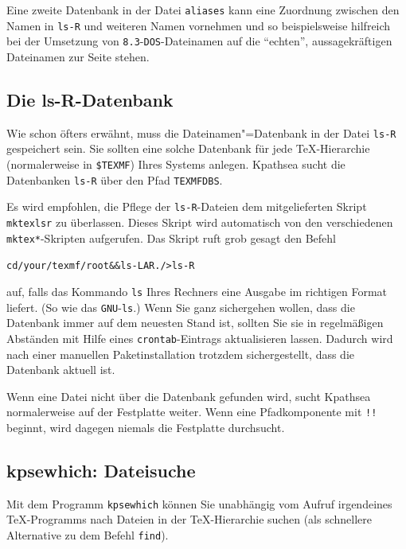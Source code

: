 \documentclass[12pt,ngerman,a4paper,fullparskip]{scrreprt}
\newcommand{\acro}[1]{\texttt{#1}}
\newcommand{\cmdname}[1]{\texttt{#1}}
\newcommand{\code}[1]{\texttt{#1}}
\newcommand{\file}[1]{\texttt{#1}}
\newcommand{\KPS}{Kpathsea\xspace}
\newcommand{\var}[1]{\texttt{#1}}
\newcommand{\samp}[1]{\texttt{#1}}
\begin{document}
Eine zweite Datenbank in der Datei \file{aliases} kann eine Zuordnung zwischen den Namen in \file{ls-R} und weiteren Namen vornehmen und so beispielsweise hilfreich bei der Umsetzung von \samp{8.3}-\acro{DOS}-Dateinamen auf die \enquote{echten}, aussagekräftigen Dateinamen zur Seite stehen.

\subsection{Die ls-R-Datenbank}\label{sec:ls-R}


Wie schon öfters erwähnt, muss die Dateinamen"=Datenbank in der Datei
\file{ls-R} gespeichert sein. Sie sollten eine solche Datenbank für jede
\TeX-Hierarchie (normalerweise in \code{\$TEXMF}) Ihres Systems anlegen.
{\KPS} sucht die Datenbanken \file{ls-R} über den Pfad \code{TEXMFDBS}.

Es wird empfohlen, die Pflege der \code{ls-R}-Dateien dem mitgelieferten
Skript \cmdname{mktexlsr} zu überlassen. Dieses Skript wird automatisch von den
verschiedenen \samp{mktex*}-Skripten aufgerufen. Das Skript ruft
grob gesagt den Befehl

\begin{alltt}
cd /\var{your}/\var{texmf}/\var{root} && ls -LAR ./ >ls-R
\end{alltt}

auf, falls das Kommando \code{ls} Ihres Rechners eine Ausgabe im richtigen
Format liefert. (So wie das \acro{GNU}-\code{ls}.) Wenn Sie ganz sichergehen
wollen, dass die Datenbank immer auf dem neuesten Stand ist, sollten Sie sie
in regelmäßigen Abständen mit Hilfe eines \cmdname{crontab}-Eintrags
aktualisieren lassen.  Dadurch wird nach einer manuellen Paketinstallation  trotzdem sichergestellt, dass die Datenbank aktuell ist.

Wenn eine Datei nicht über die Datenbank gefunden wird, sucht
{\KPS} normalerweise auf der Festplatte weiter. Wenn eine Pfadkomponente
mit \code{!!} beginnt, wird dagegen niemals die Festplatte durchsucht.


\subsection{kpsewhich: Dateisuche}
\label{sec:invoking-kpsewhich}


Mit dem Programm \cmdname{kpsewhich} können Sie unabhängig vom Aufruf
irgendeines \TeX-Programms nach Dateien in der \TeX-Hierarchie suchen
(als schnellere Alternative zu dem Befehl \cmdname{find}).
\end{document}
